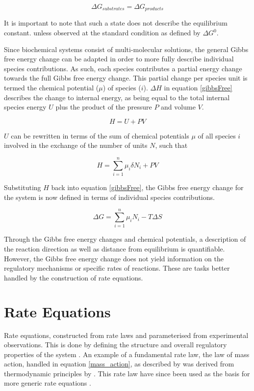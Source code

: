 \begin{equation}
\Delta G_{substrates} = \Delta G_{products}
\end{equation}

It is important to note that such a state does not describe the equilibrium constant. unless observed at the standard condition as defined by $\Delta G^0$. 

Since biochemical systems consist of multi-molecular solutions, the general Gibbs free energy change can be adapted in order to more fully describe individual species contributions. As such, each species contributes a partial energy change towards the full Gibbs free energy change. This partial change per species unit is termed the chemical potential ($\mu $) of species ($i$). $\Delta H$  in equation \ref{gibbsFree} describes the change to internal energy, as being equal to the total internal species energy $U$ plus the product of the pressure $P$ and volume $V$.

\begin{equation}
H = U + PV
\end{equation}

$U$ can be rewritten in terms of the sum of chemical potentials $\mu$ of all species $i$ involved in the exchange of the number of units $N$, such that

\begin{equation}
H = \sum^{n}_{i=1}\mu_i \delta N_i + PV
\end{equation}

Substituting $H$ back into equation \ref{gibbsFree}, the Gibbs free energy change for the system is now defined in terms of individual species contributions.

\begin{equation}
\Delta G = \sum_{i=1}^{n}\mu_i N_i - T \Delta S
\end{equation}

Through the Gibbs free energy changes and chemical potentials, a description of the reaction direction as well as distance from equilibrium is quantifiable. However, the Gibbs free energy change does not yield information on the regulatory mechanisms or specific rates of reactions. These are tasks better handled by the construction of rate equations.

\section{Rate Equations}

Rate equations, constructed from rate laws and parameterised from experimental observations. This is done by defining the structure and overall regulatory properties of the system \cite{Teusink2000, Sorribas1995}. An example of a fundamental rate law, the law of mass action, handled in equation \ref{mass_action}, as described by \citeauthor{Waage1986} was derived from thermodynamic principles by \citeauthor{VantHoff1884}. This rate law have since been used as the basis for more generic rate equations \cite{VantHoff1884, Waage1986, Voit2015}. 

